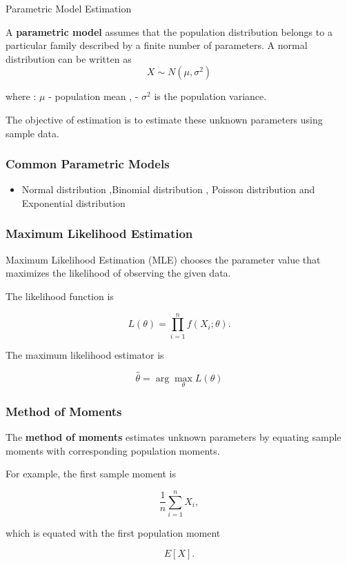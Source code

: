 \documentclass[aspectratio=169]{beamer}
\begin{document}
\begin{frame}{Parametric Model Estimation}


A \textbf{parametric model} assumes that the population distribution
belongs to a particular family described by a finite number of
parameters.
A normal distribution can be written as
\vspace{0.0 cm}
\[
X\sim N(\mu,\sigma^2)
\]

where : $\mu$ - population mean , - $\sigma^2$ is the population variance.


The objective of estimation is to estimate these unknown parameters
using sample data.

\subsubsection*{Common Parametric Models}

\begin{itemize}
    \item Normal distribution ,Binomial distribution , Poisson distribution and Exponential distribution
\end{itemize}

\subsubsection*{Maximum Likelihood Estimation}

Maximum Likelihood Estimation (MLE) chooses the parameter value that
maximizes the likelihood of observing the given data.

The likelihood function is

\[
L(\theta)
=
\prod_{i=1}^{n}f(X_i;\theta).
\]
\end{frame}
\begin{frame}
The maximum likelihood estimator is

\[
\boxed{
\hat{\theta}
=
\arg\max_{\theta}L(\theta)
}
\]

\subsubsection*{Method of Moments}

The \textbf{method of moments} estimates unknown parameters by
equating sample moments with corresponding population moments.

For example, the first sample moment is

\[
\frac{1}{n}\sum_{i=1}^{n}X_i,
\]

which is equated with the first population moment

\[
E[X].
\]
\end{frame}
\end{document}
